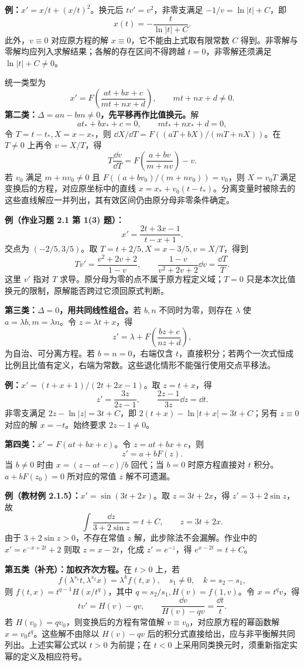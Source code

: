 \textbf{例：}$x'=x/t+(x/t)^2$。换元后 $tv'=v^2$，非零支满足 $-1/v=\ln|t|+C$，即
\[
x(t)=-\frac{t}{\ln|t|+C}.
\]
此外，$v\equiv0$ 对应原方程的解 $x\equiv0$，它不能由上式取有限常数 $C$ 得到。非零解与零解均应列入求解结果；各解的存在区间不得跨越 $t=0$，非零解还须满足 $\ln|t|+C\ne0$。

统一类型为
\[
x'=F\!\left(\frac{at+bx+c}{mt+nx+d}\right),\qquad mt+nx+d\ne0.
\]
\textbf{第二类：$\Delta=an-bm\ne0$，先平移再作比值换元。}解
\[
at_*+bx_*+c=0,\qquad mt_*+nx_*+d=0,
\]
令 $T=t-t_*,X=x-x_*$，则 $\dd X/\dd T=F((aT+bX)/(mT+nX))$。在 $T\ne0$ 上再令 $v=X/T$，得
\[
T\frac{\dd v}{\dd T}=F\!\left(\frac{a+bv}{m+nv}\right)-v.
\]
若 $v_0$ 满足 $m+nv_0\ne0$ 且 $F((a+bv_0)/(m+nv_0))=v_0$，则 $X=v_0T$ 满足变换后的方程，对应原坐标中的直线 $x=x_*+v_0(t-t_*)$。分离变量时被除去的这些直线解应一并列出，其有效区间仍由原分母非零条件确定。

\textbf{例（作业习题 2.1 第 1(3) 题）：}
\[
x'=\frac{2t+3x-1}{t-x+1}.
\]
交点为 $(-2/5,3/5)$。取 $T=t+2/5,X=x-3/5,v=X/T$，得到
\[
T v'=\frac{v^2+2v+2}{1-v},\qquad
\frac{1-v}{v^2+2v+2}\dd v=\frac{\dd T}{T}.
\]
这里 $v'$ 指对 $T$ 求导。原分母为零的点不属于原方程定义域；$T=0$ 只是本次比值换元的限制，原解能否跨过它须回原式判断。

\textbf{第三类：$\Delta=0$，用共同线性组合。}若 $b,n$ 不同时为零，则存在 $\lambda$ 使 $a=\lambda b,m=\lambda n$。令 $z=\lambda t+x$，得
\[
z'=\lambda+F\!\left(\frac{bz+c}{nz+d}\right),
\]
为自治、可分离方程。若 $b=n=0$，右端仅含 $t$，直接积分；若两个一次式恒成比例且比值有定义，右端为常数。这些退化情形不能强行使用交点平移法。

\textbf{例：}$x'=(t+x+1)/(2t+2x-1)$。取 $z=t+x$，得
\[
z'=\frac{3z}{2z-1},\qquad
\frac{2z-1}{3z}\dd z=\dd t.
\]
非零支满足 $2z-\ln|z|=3t+C$，即 $2(t+x)-\ln|t+x|=3t+C$；另有 $z\equiv0$ 对应的解 $x=-t$。始终要求 $2z-1\ne0$。

\textbf{第四类：}$x'=F(at+bx+c)$。令 $z=at+bx+c$，则
\[
z'=a+bF(z).
\]
当 $b\ne0$ 时由 $x=(z-at-c)/b$ 回代；当 $b=0$ 时原方程直接对 $t$ 积分。$a+bF(z_0)=0$ 所对应的常值 $z$ 解不可遗漏。

\textbf{例（教材例 2.1.5）：}$x'=\sin(3t+2x)$。取 $z=3t+2x$，得 $z'=3+2\sin z$，故
\[
\int\frac{\dd z}{3+2\sin z}=t+C,\qquad z=3t+2x.
\]
由于 $3+2\sin z>0$，不存在常值 $z$ 解，此步除法不会漏解。作业中的 $x'=e^{-x+2t}+2$ 则取 $z=x-2t$，化成 $z'=e^{-z}$，得 $e^{x-2t}=t+C$。

\textbf{第五类（补充）：加权齐次方程。}在 $t>0$ 上，若
\[
f(\lambda^{s_1}t,\lambda^{s_2}x)=\lambda^k f(t,x),\quad
s_1\ne0,\quad k=s_2-s_1,
\]
则 $f(t,x)=t^{q-1}H(x/t^q)$，其中 $q=s_2/s_1,H(v)=f(1,v)$。令 $x=t^qv$，得
\[
tv'=H(v)-qv,\qquad\frac{\dd v}{H(v)-qv}=\frac{\dd t}{t}.
\]
若 $H(v_0)=qv_0$，则变换后的方程有常值解 $v\equiv v_0$，对应原方程的幂函数解 $x=v_0t^q$。这些解不由除以 $H(v)-qv$ 后的积分式直接给出，应与非平衡解共同列出。上述实幂公式以 $t>0$ 为前提；在 $t<0$ 上采用同类换元时，须重新指定实幂的定义及相应符号。

